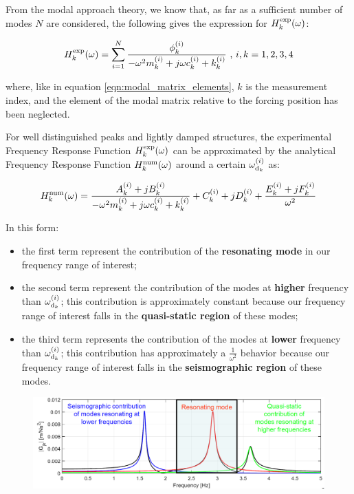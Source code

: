 \documentclass[a4paper,12pt,oneside]{article}
\begin{document}
From the modal approach theory, we know that, as far as a sufficient number of modes $ N $ are considered, the following gives the expression for $ H^\textup{exp}_k(\omega) $:

\[
	H^\textup{exp}_k(\omega) = \sum_{i=1}^{N} \frac{\phi_k^{(i)}}
		{-\omega^2 m^{(i)}_k + j \omega c^{(i)}_k + k^{(i)}_k}
		~ \text{,} ~ i,k = 1,2,3,4
\]

where, like in equation \eqref{eqn:modal_matrix_elements}, $ k $ is the measurement index, and the element of the modal matrix relative to the forcing position has been neglected.

For well distinguished peaks and lightly damped structures, the experimental Frequency Response Function $ H^\textup{exp}_k(\omega) $ can be approximated by the analytical Frequency Response Function $ H^\textup{num}_k(\omega) $ around a certain $ \omega_{\textup{d}_k}^{(i)} $ as:

\[	
	H^\textup{num}_k(\omega) = \frac{A^{(i)}_k + j B^{(i)}_k}
		{-\omega^2 m^{(i)}_k + j \omega c^{(i)}_k + k^{(i)}_k}
		+ C^{(i)}_k + j D^{(i)}_k
		+ \frac{E^{(i)}_k + j F^{(i)}_k}{\omega^2}
\]

In this form:

\begin{itemize}
	\item the first term represent the contribution of the \textbf{resonating mode} in our frequency range of interest;
	\item the second term represent the contribution of the modes at \textbf{higher} frequency than $ \omega_{\textup{d}_k}^{(i)} $; this contribution is approximately constant because our frequency range of interest falls in the \textbf{quasi-static region} of these modes;
	\item the third term represents the contribution of the modes at \textbf{lower} frequency than $ \omega_{\textup{d}_k}^{(i)} $; this contribution has approximately a $ \frac{1}{\omega^2} $ behavior because our frequency range of interest falls in the \textbf{seismographic region} of these modes.
\end{itemize}

\begin{figure}[H]
	\includegraphics[scale=0.4]{frf_num_regions}
\end{figure}
\end{document}
